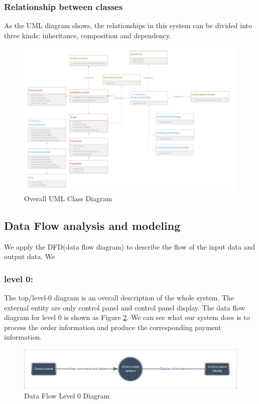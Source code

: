 \documentclass[a4paper]{report}
\begin{document}
\subsubsection{Relationship between classes}
As the UML diagram shows, the relationships in this system can be divided into three kinds: inheritance, composition and dependency.
\begin{figure}
  \centering
  \includegraphics[scale=0.38]{UMLClass.pdf}
  \caption{Overall UML Class Diagram}\label{4}
\end{figure}
\subsection{Data Flow analysis and modeling}
We apply the DFD(data flow diagram) to describe the flow of the input data and output data.
We 
\subsubsection{level 0:} The top/level-0 diagram is an overall description of the whole system. The external entity are only control panel and control panel display. The data flow diagram for level 0 is shown as Figure \ref{5}. We can see what our system does is to process the order information and produce the corresponding payment information.
\begin{figure}
  \centering
  \includegraphics[scale=0.38]{DataFlowLevel0.pdf}
  \caption{Data Flow Level 0 Diagram}\label{5}
\end{figure}
\end{document}
